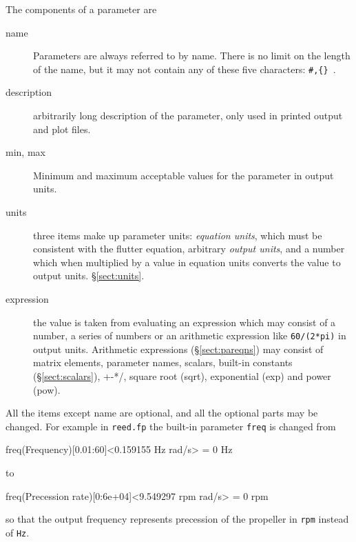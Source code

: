 \documentclass[10pt,openany,twoside]{book}
\numberwithin{equation}{section}   %
\newcommand{\Code}[1]{{\small\tt #1}}
\newcommand{\Sectref}[1]{\S\ref{#1}}
\newcommand{\Tableref}[1]{Table \ref{#1}}
\newcommand{\Subst}[1]{{\small\sf #1}}
\begin{document}
The components of a parameter are
\begin{description}
	\item[\Subst{name}] Parameters are always referred to by name. There is
		no limit on the length of the name, but it may not contain
		any of these five characters: \verb*+#,{} +.
                
	\item[\Subst{description}] arbitrarily long description of the parameter,
			 only used in printed output and plot files.
                
	\item[\Subst{min, max}]
	Minimum and maximum acceptable values for the parameter in output units.
                
	\item[\Subst{units}]
	three items make up parameter units: \emph{equation units}, which
	must be consistent with the flutter equation,
	arbitrary \emph{output units}, and a number which when multiplied
	by a value in equation units converts the value to output units.
	\Sectref{sect:units}.
                
	\item[\Subst{expression}]
	the value is taken from evaluating an expression which may consist of
	a number, a series of numbers or an arithmetic expression like
	\verb+60/(2*pi)+ in output units.
	Arithmetic expressions (\Sectref{sect:pareqns})
	may consist of matrix elements, parameter names, scalars, built-in constants
	(\Sectref{sect:scalars}), +-*/, square root (sqrt), exponential (exp)
	and power (pow).
                
\end{description}

All the items except \Subst{name} are optional, and all the optional
parts may be changed. For example in \Code{reed.fp} the built-in parameter
\Code{freq} is changed from
\begin{example}
   freq(Frequency)[0.01:60]<0.159155 Hz rad/s> = 0 Hz
\end{example}
to
\begin{example}
   freq(Precession rate)[0:6e+04]<9.549297 rpm rad/s> = 0 rpm
\end{example}
so that the output frequency represents precession of the propeller
in \Code{rpm} instead of \Code{Hz}.
\end{document}
